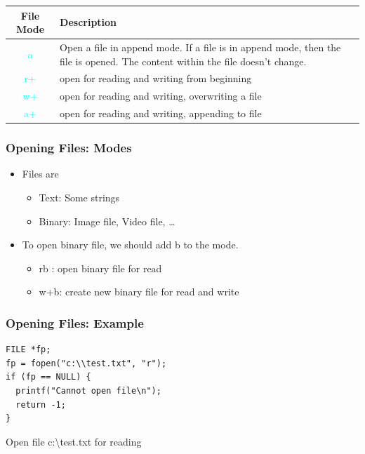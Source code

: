 \documentclass{../c-lecture}
\begin{document}
\begin{frame}
  \begin{table}
  \begin{tabularx}{\textwidth}{cX}
    \toprule
    File Mode &
    Description \\
    \midrule
    \textcolor{Cyan}{a} &
    Open a file in append mode. If a file is in append mode, then the
    file is opened. The content within the file doesn't change. \\
    \midrule
    \textcolor{Cyan}{r+} &
    open for reading and writing from beginning \\
    \midrule
    \textcolor{Cyan}{w+} &
    open for reading and writing, overwriting a file \\
    \midrule
    \textcolor{Cyan}{a+} &
    open for reading and writing, appending to file \\
    \bottomrule
  \end{tabularx}
  \end{table}
\end{frame}

\begin{frame}
  \frametitle{Opening Files: Modes}
  \begin{itemize}
    \item Files are
    \begin{itemize}
      \item Text: Some strings
      \item Binary: Image file, Video file, \ldots
    \end{itemize}
    \item To open binary file, we should add b to the mode.
    \begin{itemize}
      \item rb : open binary file for read
      \item w+b: create new binary file for read and write
    \end{itemize}
  \end{itemize}
\end{frame}

\begin{frame}[fragile]
  \frametitle{Opening Files: Example}
  \begin{verbatim}
FILE *fp;
fp = fopen("c:\\test.txt", "r");
if (fp == NULL) {
  printf("Cannot open file\n");
  return -1;
}
  \end{verbatim}
  Open file c:\textbackslash test.txt for reading
\end{frame}
\end{document}
